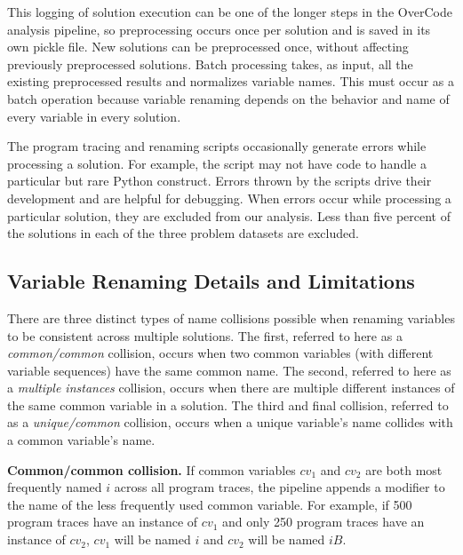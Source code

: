This logging of solution execution can be one of the longer steps in the OverCode analysis pipeline, so preprocessing occurs once per solution and is saved in its own pickle file. New solutions can be preprocessed once, without affecting previously preprocessed solutions. Batch processing takes, as input, all the existing preprocessed results and normalizes variable names. This must occur as a batch operation because variable renaming depends on the behavior and name of every variable in every solution.

The program tracing \cite{pgbovineOPT} and renaming scripts occasionally generate errors while processing a solution. For example, the script may not have code to handle a particular but rare Python construct. Errors thrown by the scripts drive their development and are helpful for debugging. When errors occur while processing a particular solution, they are excluded from our analysis. Less than five percent of the solutions in each of the three problem datasets are excluded.

\subsection{Variable Renaming Details and Limitations} \label{repercussions}

There are three distinct types of name collisions possible when renaming variables to be consistent across multiple solutions. The first, referred to here as a {\it common/common} collision, occurs when two common variables (with different variable sequences) have the same common name. The second, referred to here as a {\it multiple instances} collision, occurs when there are multiple different instances of the same common variable in a solution. The third and final collision, referred to as a {\it unique/common} collision, occurs when a unique variable's name collides with a common variable's name.

{\bf Common/common collision.} If common variables $cv_{1}$ and $cv_{2}$ are both most frequently named $i$ across all program traces, the pipeline appends a modifier to the name of the less frequently used common variable. For example, if 500 program traces have an instance of $cv_{1}$ and only 250 program traces have an instance of $cv_{2}$, $cv_{1}$ will be named $i$ and $cv_{2}$ will be named $iB$. 

